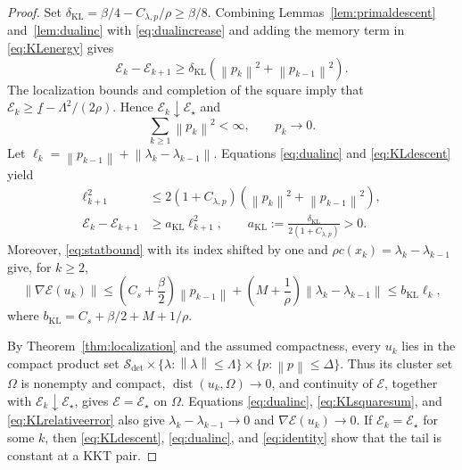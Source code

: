\documentclass[11pt]{article}
\theoremstyle{definition}
\theoremstyle{remark}
\numberwithin{equation}{section}
\numberwithin{figure}{section}
\numberwithin{table}{section}
\numberwithin{algorithm}{section}
\newcommand{\norm}[1]{\left\lVert #1\right\rVert}
\newcommand{\grad}{\nabla}
\begin{document}
\begin{proof}
Set
\(\delta_{\mathrm{KL}}=\beta/4-C_{\lambda,p}/\rho\ge\beta/8\).
Combining Lemmas~\ref{lem:primaldescent} and~\ref{lem:dualinc} with
\eqref{eq:dualincrease} and adding the memory term in \eqref{eq:KLenergy}
gives
\begin{equation}
 \mathcal E_k-\mathcal E_{k+1}
 \ge\delta_{\mathrm{KL}}
 \left(\norm{p_k}^2+\norm{p_{k-1}}^2\right).
 \label{eq:KLdescent}
\end{equation}
The localization bounds and completion of the square imply that
\(\mathcal E_k\ge \underline{f}-\Lambda^2/(2\rho)\).  Hence
\(\mathcal E_k\downarrow\mathcal E_\star\) and
\begin{equation}
 \sum_{k\ge1}\norm{p_k}^2<\infty,\qquad p_k\to0.
 \label{eq:KLsquaresum}
\end{equation}
Let \(\ell_k=\norm{p_{k-1}}+\norm{\lambda_k-\lambda_{k-1}}\).  Equations \eqref{eq:dualinc} and \eqref{eq:KLdescent} yield
\begin{align}
 \ell_{k+1}^2
 &\le2(1+C_{\lambda,p})
       \left(\norm{p_k}^2+\norm{p_{k-1}}^2\right),
 \label{eq:KLlengthcontrol}\\
 \mathcal E_k-\mathcal E_{k+1}
 &\ge a_{\mathrm{KL}}\ell_{k+1}^2,\qquad
 a_{\mathrm{KL}}:=
 \frac{\delta_{\mathrm{KL}}}{2(1+C_{\lambda,p})}>0.
 \label{eq:KLlengthdescent}
\end{align}
Moreover, \eqref{eq:statbound} with its index shifted by one and
\(\rho c(x_k)=\lambda_k-\lambda_{k-1}\) give, for \(k\ge2\),
\begin{equation}
 \norm{\grad\mathcal E(u_k)}
 \le\left(C_s+\frac\beta2\right)\norm{p_{k-1}}
    +\left(M+\frac1\rho\right)
      \norm{\lambda_k-\lambda_{k-1}} 
 \le b_{\mathrm{KL}}\ell_k,
 \label{eq:KLrelativeerror}
\end{equation}
where \(b_{\mathrm{KL}}=C_s+\beta/2+M+1/\rho\).

By Theorem~\ref{thm:localization} and the assumed compactness, every \(u_k\)
lies in the compact product set
\(\mathcal S_{\mathrm{det}}
\times\{\lambda:\norm{\lambda}\le\Lambda\}
\times\{p:\norm{p}\le\Delta\}\).  Thus its cluster set \(\Omega\) is
nonempty and compact, \(\operatorname{dist}(u_k,\Omega)\to0\), and continuity
of \(\mathcal E\), together with \(\mathcal E_k\downarrow\mathcal E_\star\),
gives \(\mathcal E=\mathcal E_\star\) on \(\Omega\).  Equations
\eqref{eq:dualinc}, \eqref{eq:KLsquaresum}, and
\eqref{eq:KLrelativeerror} also give
\(\lambda_k-\lambda_{k-1}\to0\) and
\(\grad\mathcal E(u_k)\to0\).
If \(\mathcal E_k=\mathcal E_\star\) for some \(k\), then
\eqref{eq:KLdescent}, \eqref{eq:dualinc}, and \eqref{eq:identity} show
that the tail is constant at a KKT pair.


\end{proof}
\end{document}

